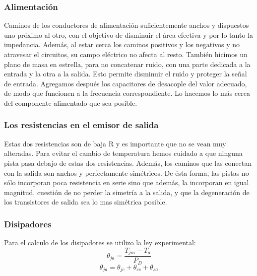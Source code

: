 
\subsubsection*{Alimentación}
Caminos de los conductores de alimentación suficientemente anchos y  dispuestos uno próximo al otro, con el objetivo de disminuir el área efectiva y por lo tanto la impedancia. Además, al estar cerca los caminos positivos y los negativos y no atravesar el circuitos, su campo eléctrico no afecta al resto.
También hicimos un plano de masa en estrella, para no concatenar ruido, con una parte dedicada a la entrada y la otra a la salida. Esto permite disminuir el ruido y proteger la señal de entrada.
 Agregamos después los capacitores de desacople del valor adecuado, de modo que funcionen a la frecuencia correspondiente. Lo hacemos lo más cerca del componente alimentado que sea posible.

\subsubsection*{Los resistencias en el emisor de salida}
Estas dos resistencias son de baja R y es importante que no se vean muy alteradas. Para evitar el cambio de temperatura hemos cuidado a que ninguna pista pasa debajo de estas dos resistencias. Además, los caminos que las conectan con la salida son anchos y perfectamente simétricos. De ésta forma, las pistas no sólo incorporan poca resistencia en serie sino que además, la incorporan en igual magnitud, cuestión de no perder la simetría a la salida, y que la degeneración de los transistores de salida sea lo mas simétrica posible.


\subsubsection{Disipadores}
\bigskip
Para el calculo de los disipadores se utilizo la ley experimental:
$$
   \theta_{ja}=\dfrac{T_{jm}-T_a}{P_D}
$$
$$
	\theta_{ja}=\theta_{jc}+\theta_{cs}+\theta_{sa}
$$


